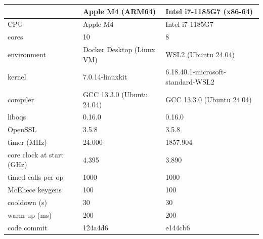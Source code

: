 \begin{tabular}{lll}
\toprule
 & Apple M4 (ARM64) & Intel i7-1185G7 (x86-64) \\
\midrule
CPU & Apple M4 & Intel i7-1185G7 \\
cores & 10 & 8 \\
environment & Docker Desktop (Linux VM) & WSL2 (Ubuntu 24.04) \\
kernel & 7.0.14-linuxkit & 6.18.40.1-microsoft-standard-WSL2 \\
compiler & GCC 13.3.0 (Ubuntu 24.04) & GCC 13.3.0 (Ubuntu 24.04) \\
liboqs & 0.16.0 & 0.16.0 \\
OpenSSL & 3.5.8 & 3.5.8 \\
timer (MHz) & 24.000 & 1857.904 \\
core clock at start (GHz) & 4.395 & 3.890 \\
timed calls per op & 1000 & 1000 \\
McEliece keygens & 100 & 100 \\
cooldown (s) & 30 & 30 \\
warm-up (ms) & 200 & 200 \\
code commit & 124a4d6 & e144cb6 \\
\bottomrule
\end{tabular}
